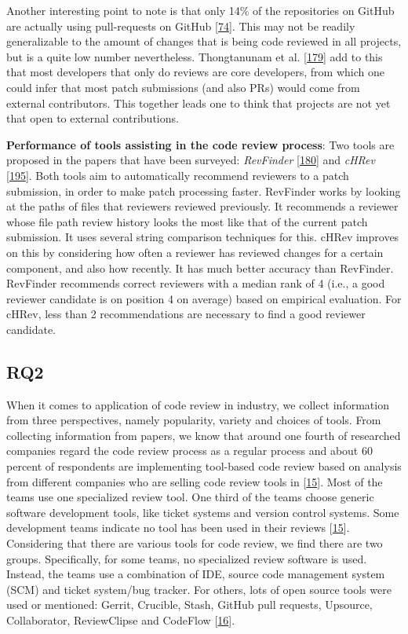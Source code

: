 \documentclass[]{book}
\begin{document}
Another interesting point to note is that only 14\% of the repositories
on GitHub are actually using pull-requests on GitHub
{[}\protect\hyperlink{ref-gousios2014exploratory}{74}{]}. This may not
be readily generalizable to the amount of changes that is being code
reviewed in all projects, but is a quite low number nevertheless.
Thongtanunam et al.
{[}\protect\hyperlink{ref-thongtanunam2016revisiting}{179}{]} add to
this that most developers that only do reviews are core developers, from
which one could infer that most patch submissions (and also PRs) would
come from external contributors. This together leads one to think that
projects are not yet that open to external contributions.

\textbf{Performance of tools assisting in the code review process}: Two
tools are proposed in the papers that have been surveyed:
\emph{RevFinder}
{[}\protect\hyperlink{ref-thongtanunam2015should}{180}{]} and
\emph{cHRev}
{[}\protect\hyperlink{ref-zanjani2016automatically}{195}{]}. Both tools
aim to automatically recommend reviewers to a patch submission, in order
to make patch processing faster. RevFinder works by looking at the paths
of files that reviewers reviewed previously. It recommends a reviewer
whose file path review history looks the most like that of the current
patch submission. It uses several string comparison techniques for this.
cHRev improves on this by considering how often a reviewer has reviewed
changes for a certain component, and also how recently. It has much
better accuracy than RevFinder. RevFinder recommends correct reviewers
with a median rank of 4 (i.e., a good reviewer candidate is on position
4 on average) based on empirical evaluation. For cHRev, less than 2
recommendations are necessary to find a good reviewer candidate.

\subsection{RQ2}\label{rq2}

When it comes to application of code review in industry, we collect
information from three perspectives, namely popularity, variety and
choices of tools. From collecting information from papers, we know that
around one fourth of researched companies regard the code review process
as a regular process and about 60 percent of respondents are
implementing tool-based code review based on analysis from different
companies who are selling code review tools in
{[}\protect\hyperlink{ref-baum2017choice}{15}{]}. Most of the teams use
one specialized review tool. One third of the teams choose generic
software development tools, like ticket systems and version control
systems. Some development teams indicate no tool has been used in their
reviews {[}\protect\hyperlink{ref-baum2017choice}{15}{]}. Considering
that there are various tools for code review, we find there are two
groups. Specifically, for some teams, no specialized review software is
used. Instead, the teams use a combination of IDE, source code
management system (SCM) and ticket system/bug tracker. For others, lots
of open source tools were used or mentioned: Gerrit, Crucible, Stash,
GitHub pull requests, Upsource, Collaborator, ReviewClipse and CodeFlow
{[}\protect\hyperlink{ref-baum2016faceted}{16}{]}.
\end{document}
